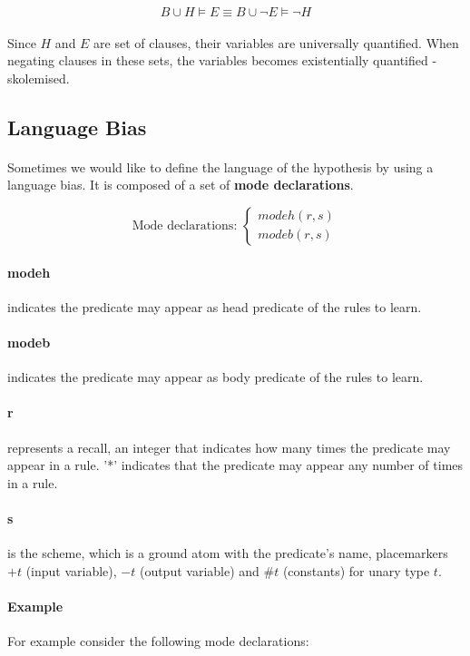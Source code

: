 \documentclass{article}
\theoremstyle{plain}
\theoremstyle{definition}
\begin{document}
\begin{multicols}{2}
\[ B \cup H \models E \equiv B \cup \lnot E \models \lnot H \]

\paragraph{} Since $H$ and $E$ are set of clauses, their variables are universally quantified. When negating clauses in these sets, the variables becomes existentially quantified - skolemised. 

\subsection{Language Bias}\label{sec:LanguageBias}

\paragraph{} Sometimes we would like to define the language of the hypothesis by using a language bias. It is composed of a set of \textbf{mode declarations}.

\[
\text{Mode declarations: }
\begin{cases}
	modeh(r, s)\\
	modeb(r, s)
\end{cases}
\]

\paragraph{modeh} indicates the predicate may appear as head predicate of the rules to learn.
\paragraph{modeb} indicates the predicate may appear as body predicate of the rules to learn.
\paragraph{r} represents a recall, an integer that indicates how many times the predicate may appear in a rule. '*' indicates that the predicate may appear any number of times in a rule.
\paragraph{s} is the scheme, which is a ground atom with the predicate's name, placemarkers $+t$ (input variable), $-t$ (output variable) and $\#t$ (constants) for unary type $t$. 

\paragraph{Example} For example consider the following mode declarations:


\end{multicols}
\end{document}
